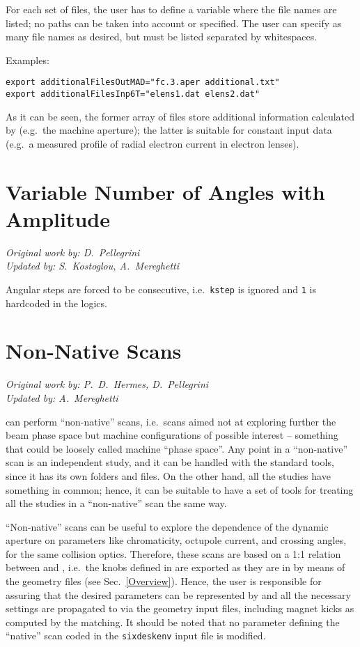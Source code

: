 For each set of files, the user has to define a variable where the file names
are listed; no paths can be taken into account or specified. The user can
specify as many file names as desired, but must be listed separated by
whitespaces.

Examples:
\begin{lstlisting}
export additionalFilesOutMAD="fc.3.aper additional.txt"
export additionalFilesInp6T="elens1.dat elens2.dat"
\end{lstlisting}
As it can be seen, the former array of files store additional information
calculated by \MADX{} (e.g.~the machine aperture); the latter is suitable
for constant input data (e.g.~a measured profile of radial electron current
in electron lenses).

\section{Variable Number of Angles with Amplitude} \label{varAnglesWithAmpli}
\begin{flushright}
\emph{Original work by: D.~Pellegrini} \\
\emph{Updated by: S.~Kostoglou, A.~Mereghetti}
\end{flushright}
Angular steps are forced to be consecutive, i.e.~\texttt{kstep} is
ignored and \texttt{1} is hardcoded in the logics.

\section{Non-Native Scans} \label{ExternalScans}
\begin{flushright}
\emph{Original work by: P.~D.~Hermes, D.~Pellegrini} \\
\emph{Updated by: A.~Mereghetti}
\end{flushright}
\SIXDESK{} can perform ``non-native'' scans, i.e.~scans aimed not at
exploring further the beam phase space but machine configurations of possible
interest -- something that could be loosely called machine ``phase space''.
Any point in a ``non-native'' scan
is an independent \SIXDESK{} study, and it can be handled
with the standard tools, since it has its own folders and files.
On the other hand, all the studies have something in common; hence,
it can be suitable to have a set of tools for treating all the
studies in a ``non-native'' scan the same way.

``Non-native'' scans can be useful to explore the dependence of the dynamic
aperture on parameters like chromaticity, octupole current, and crossing
angles, for the same collision optics. Therefore,
these scans are based on a 1:1 relation between \MADX{} and
\SIXTRACK{}, i.e.~the knobs defined in \MADX{} are exported as they
are in \SIXTRACK{} by means of the geometry files (see Sec.~\ref{Overview}).
Hence, the user is responsible for assuring that the desired parameters can be
represented by \MADX{} and all the necessary settings are propagated
to \SIXTRACK{} via the geometry input files,
including magnet kicks as computed by the \MADX{} matching.
It should be noted that no parameter defining the ``native'' scan
coded in the \texttt{sixdeskenv} input file is modified.

